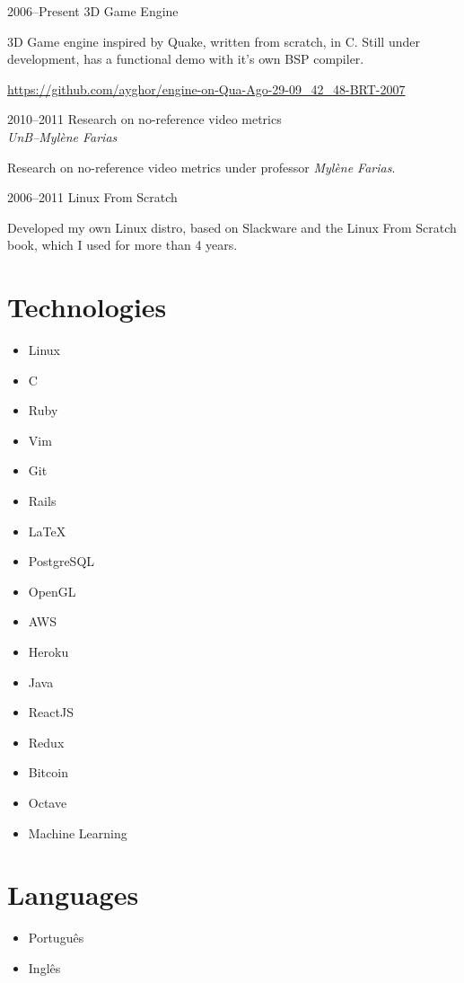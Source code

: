 \documentclass[a4paper,twoside]{simplecv}
\begin{document}
\begin{topic}
\item[2006--Present] 3D Game Engine

	3D Game engine inspired by Quake, written from scratch, in C. Still
	under development, has a functional demo with it's own BSP compiler.

	{\scriptsize\url{https://github.com/ayghor/engine-on-Qua-Ago-29-09\_42\_48-BRT-2007}}

\item[2010--2011] Research on no-reference video metrics\\
	{\em\small UnB--Mylène Farias}

	Research on no-reference video metrics under professor \emph{Mylène
	Farias}.

\item[2006--2011] Linux From Scratch

	Developed my own Linux distro, based on Slackware and the Linux From Scratch book, which I used for more than 4 years.
\end{topic}

\section{Technologies}

\begin{multicols}{4}
	\raggedcolumns
	\begin{itemize}
		\item Linux
		\item C
		\item Ruby
		\item Vim
		\item Git
		\item Rails
		\item \LaTeX{}
		\item PostgreSQL
		\item OpenGL
		\item AWS
		\item Heroku
		\item Java
		\item ReactJS
		\item Redux
		\item Bitcoin
		\item Octave
		\item Machine Learning
	\end{itemize}
\end{multicols}

\section{Languages}

\begin{multicols}{4}
	\raggedcolumns
	\begin{itemize}
		\item Português
		\item Inglês
	\end{itemize}
\end{multicols}

%
\end{document}

